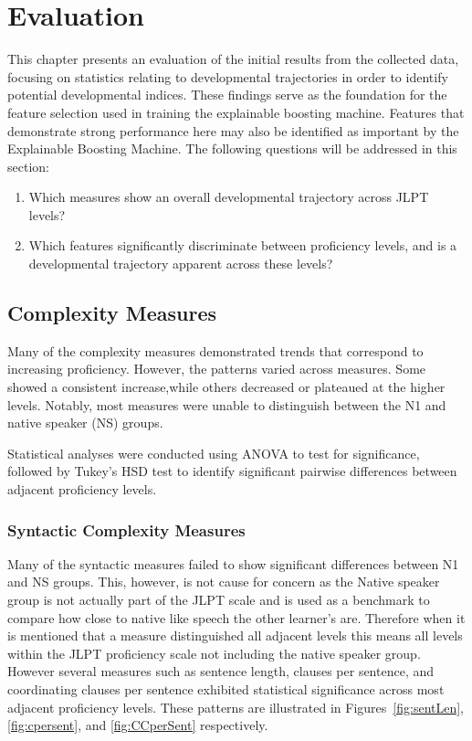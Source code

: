 \chapter{Evaluation} 
This chapter presents an evaluation of the initial results from the collected data, focusing on statistics relating to
developmental trajectories in order to identify potential developmental indices. These findings serve as the
foundation
for the feature selection used in training the explainable boosting machine. Features that demonstrate strong
performance here may also be identified as important by the Explainable Boosting Machine. The following questions
will be
addressed in this
section:

\begin{enumerate}
    \item Which measures show an overall developmental trajectory across JLPT levels?
    \item Which features significantly discriminate between proficiency levels, and is a developmental trajectory
    apparent across these levels?
\end{enumerate}

\section{Complexity Measures}

Many of the complexity measures demonstrated trends that correspond to increasing proficiency. However, the patterns
varied across measures. Some showed a consistent increase,while others
decreased or plateaued at the
higher levels. Notably, most measures were unable to distinguish between the N1 and native speaker (NS) groups.

Statistical analyses were conducted using ANOVA to test for significance, followed by Tukey's HSD test to identify
significant pairwise differences between adjacent proficiency levels.

\subsection{Syntactic Complexity Measures}


Many of the syntactic measures failed to show significant differences between N1 and NS groups. This, however, is not
cause for concern as the Native speaker group is not actually part of the JLPT scale and is used as a benchmark to
compare how close to native like speech the other learner's are. Therefore when it is mentioned that a measure
distinguished all adjacent levels this means all levels within the JLPT proficiency scale not including the native
speaker group.
However several measures
such as sentence length, clauses per sentence, and coordinating clauses per sentence exhibited statistical significance
across most
adjacent proficiency levels. These patterns are illustrated in Figures~\ref{fig:sentLen}, \ref{fig:cpersent}, and \ref{fig:CCperSent} respectively.

